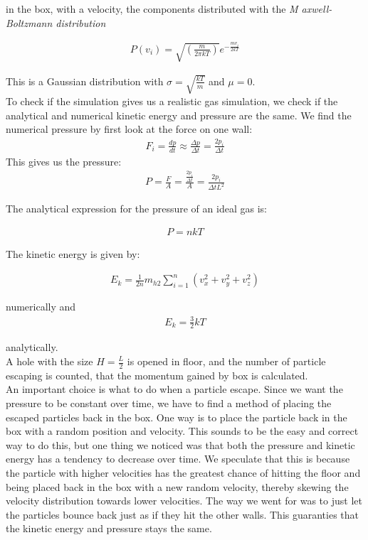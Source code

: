 \documentclass[a4paper, 10pt]{article}
\begin{document}
in the box, with a velocity, the components distributed with the \textit{M axwell-Boltzmann distribution}

\begin{align}
P(v_i) = \sqrt{\left( \frac{m}{2 \pi k T} \right)} e^{-\frac{m v_i}{2kT}}
\end{align}

This is a Gaussian distribution with $\sigma = \sqrt{ \frac{kT}{m}}$
and $\mu = 0$.\\

To check if the simulation gives us a realistic gas simulation, we check if the analytical and numerical kinetic energy and pressure are the same. We find the numerical pressure by first look at the force on one wall:
\begin{align}
F_i = \frac{dp}{dt} \approx \frac{\Delta p}{\Delta t} = \frac{2p_i}{\Delta t}
\end{align}
This gives us the pressure:
\begin{align}
P = \frac{F}{A} = \frac{\frac{2p_i}{\Delta t}}{A} = \frac{2p_i}{\Delta t L^{2}}
\end{align}

The analytical expression for the pressure of an ideal gas is:

\begin{align}
P = nkT
\end{align}


The kinetic energy is given by:

\begin{align}
E_k = \frac{1}{2n}m_{h2}\sum\limits_{i=1}^{n}(v_x^{2} + v_y^{2} + v_z^{2})
\end{align}

numerically and
\begin{align}
 E_k = \frac{3}{2}kT
\end{align}

analytically. \\

A hole with the size $H =\frac{L}{2}$ is opened in floor, and the number of particle escaping is counted, that the momentum gained by box is calculated.\\

An important choice is what to do when a particle escape. Since we want the pressure to be constant over time, we have to find a method of placing the escaped particles back in the box. One way is to place the particle back in the box with a random position and velocity. This sounds to be the easy and correct way to do this, but one thing we noticed was that both the pressure and kinetic energy has a tendency to decrease over time. We speculate that this is because the particle with higher velocities has the greatest chance of hitting the floor and being placed back in the box with a new random velocity, thereby skewing the velocity distribution towards lower velocities. The way we went for was to just let the particles bounce back just as if they hit the other walls. This guaranties that the kinetic energy and pressure stays the same. 
\end{document}
